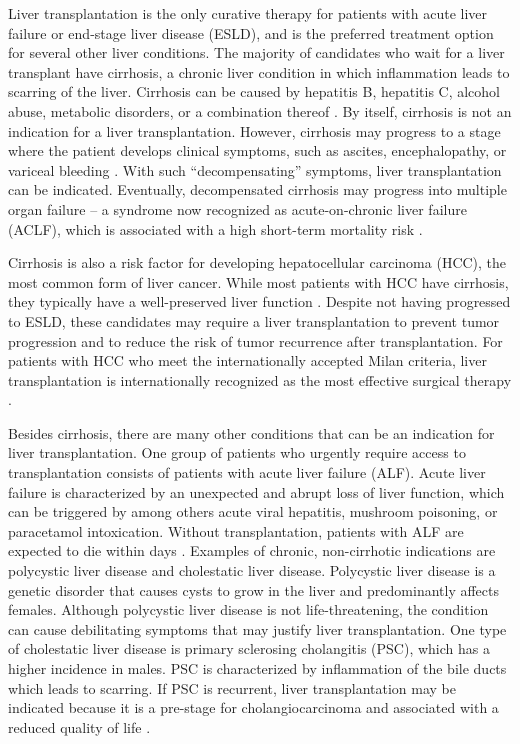 \documentclass[11pt,twoside,]{book}
\begin{document}
Liver transplantation is the only curative therapy for patients with acute liver
failure or end-stage liver disease (ESLD), and is the preferred treatment option for
several other liver conditions. The majority of candidates who wait for a liver
transplant have cirrhosis, a chronic liver condition in which inflammation leads
to scarring of the liver. Cirrhosis can be caused by hepatitis B, hepatitis C,
alcohol abuse, metabolic disorders, or a combination thereof \citep{olearyIndicationsLiverTransplantation2008}.
By itself, cirrhosis is not an indication for a liver
transplantation. However, cirrhosis may progress to a stage where the patient
develops clinical symptoms, such as ascites, encephalopathy, or variceal bleeding \citep{olearyIndicationsLiverTransplantation2008}.
With such ``decompensating'' symptoms, liver transplantation can be indicated.
Eventually, decompensated cirrhosis may progress into multiple organ failure
-- a syndrome now recognized as acute-on-chronic liver failure (ACLF),
which is associated with a high short-term mortality risk \citep{Arroyo2020}.

Cirrhosis is also a risk factor for developing hepatocellular carcinoma (HCC),
the most common form of liver cancer. While most patients with HCC have cirrhosis,
they typically have a well-preserved liver function \citep{olearyIndicationsLiverTransplantation2008}.
Despite not having progressed to ESLD, these candidates may require a
liver transplantation to prevent tumor progression and to reduce the risk of
tumor recurrence after transplantation. For patients with HCC who meet the internationally
accepted Milan criteria, liver transplantation is internationally recognized as
the most effective surgical therapy \citep{Galle2018}.

Besides cirrhosis, there are many other conditions that can be an indication
for liver transplantation. One group of patients who urgently require access
to transplantation consists of patients with acute liver failure (ALF).
Acute liver failure is characterized
by an unexpected and abrupt loss of liver function, which can be triggered by
among others acute viral hepatitis, mushroom poisoning, or paracetamol intoxication. Without
transplantation, patients with ALF are expected to die within days \citep{stravitzAcuteLiverFailure2019}.
Examples of chronic, non-cirrhotic indications are polycystic liver disease and cholestatic
liver disease. Polycystic liver disease is a genetic
disorder that causes cysts to grow in the liver and predominantly affects females.
Although polycystic liver disease is not life-threatening, the condition can
cause debilitating symptoms that may justify liver transplantation.
One type of cholestatic liver disease is primary sclerosing cholangitis (PSC),
which has a higher incidence in males. PSC is characterized by inflammation of the bile ducts
which leads to scarring. If PSC is recurrent, liver transplantation may be indicated
because it is a pre-stage for cholangiocarcinoma and associated with a
reduced quality of life \citep{olearyIndicationsLiverTransplantation2008}.
\end{document}
